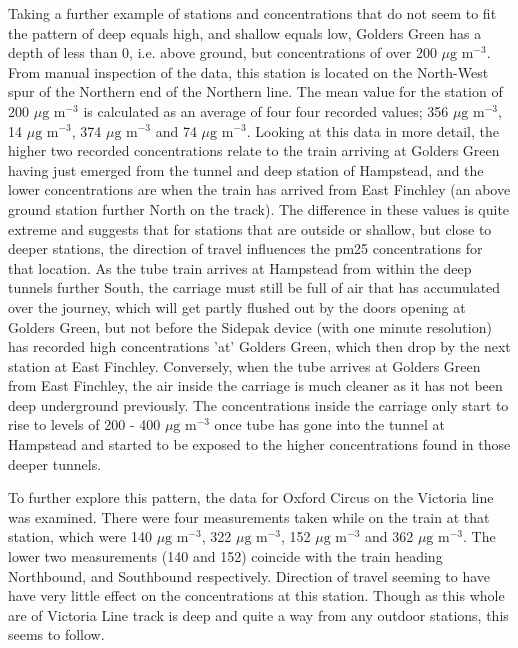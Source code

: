 Taking a further example of stations and concentrations that do not seem to fit the pattern of deep equals high, and shallow equals low, Golders Green has a depth of less than 0, i.e. above ground, but concentrations of over 200 $\mu \text{g m}^{-3}$. From manual inspection of the data, this station is located on the North-West spur of the Northern end of the Northern line. The mean value for the station of 200 $\mu \text{g m}^{-3}$ is calculated as an average of four four recorded values; 356 $\mu \text{g m}^{-3}$, 14 $\mu \text{g m}^{-3}$, 374 $\mu \text{g m}^{-3}$ and 74 $\mu \text{g m}^{-3}$. Looking at this data in more detail, the higher two recorded concentrations relate to the train arriving at Golders Green having just emerged from the tunnel and deep station of Hampstead, and the lower concentrations are when the train has arrived from East Finchley (an above ground station further North on the track). The difference in these values is quite extreme and suggests that for stations that are outside or shallow, but close to deeper stations, the direction of travel influences the \gls{pm25} concentrations for that location. As the tube train arrives at Hampstead from within the deep tunnels further South, the carriage must still be full of air that has accumulated over the journey, which will get partly flushed out by the doors opening at Golders Green, but not before the Sidepak device (with one minute resolution) has recorded high concentrations 'at' Golders Green, which then drop by the next station at East Finchley. Conversely, when the tube arrives at Golders Green from East Finchley, the air inside the carriage is much cleaner as it has not been deep underground previously. The concentrations inside the carriage only start to rise to levels of 200 - 400 $\mu \text{g m}^{-3}$ once tube has gone into the tunnel at Hampstead and started to be exposed to the higher concentrations found in those deeper tunnels. 

To further explore this pattern, the data for Oxford Circus on the Victoria line was examined. There were four measurements taken while on the train at that station, which were 140 $\mu \text{g m}^{-3}$, 322 $\mu \text{g m}^{-3}$, 152 $\mu \text{g m}^{-3}$ and 362 $\mu \text{g m}^{-3}$. The lower two measurements (140 and 152) coincide with the train heading Northbound, and Southbound respectively. Direction of travel seeming to have have very little effect on the concentrations at this station. Though as this whole are of Victoria Line track is deep and quite a way from any outdoor stations, this seems to follow. 

